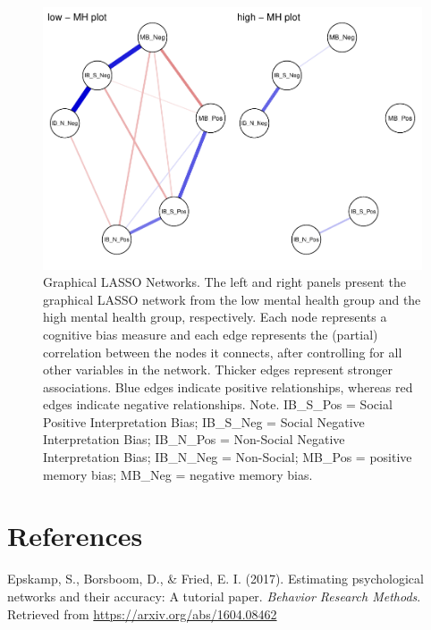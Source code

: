 \documentclass[
  english,
  man,floatsintext]{apa6}
\begin{document}
\begin{figure}
\centering
\includegraphics{supplimental_analysis_files/figure-latex/unnamed-chunk-1-1.pdf}
\caption{\label{fig:unnamed-chunk-1}Graphical LASSO Networks. The left and right panels present the graphical LASSO network from the low mental health group and the high mental health group, respectively. Each node represents a cognitive bias measure and each edge represents the (partial) correlation between the nodes it connects, after controlling for all other variables in the network. Thicker edges represent stronger associations. Blue edges indicate positive relationships, whereas red edges indicate negative relationships.
Note. IB\_S\_Pos = Social Positive Interpretation Bias; IB\_S\_Neg = Social Negative Interpretation Bias; IB\_N\_Pos = Non-Social Negative Interpretation Bias; IB\_N\_Neg = Non-Social; MB\_Pos = positive memory bias; MB\_Neg = negative memory bias.}
\end{figure}

\newpage

\hypertarget{references}{%
\section{References}\label{references}}

\begingroup
\setlength{\parindent}{-0.5in}
\setlength{\leftskip}{0.5in}

\hypertarget{refs}{}
\leavevmode\hypertarget{ref-R-bootnet}{}%
Epskamp, S., Borsboom, D., \& Fried, E. I. (2017). Estimating psychological networks and their accuracy: A tutorial paper. \emph{Behavior Research Methods}. Retrieved from \url{https://arxiv.org/abs/1604.08462}
\end{document}
